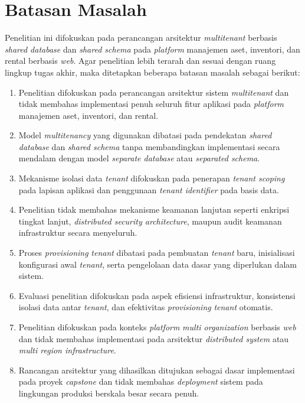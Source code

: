 \section{Batasan Masalah}

Penelitian ini difokuskan pada perancangan arsitektur \textit{multitenant} berbasis \textit{shared database}
dan \textit{shared schema} pada \textit{platform} manajemen aset, inventori, dan rental berbasis \textit{web}. Agar
penelitian lebih terarah dan sesuai dengan ruang lingkup tugas akhir, maka ditetapkan beberapa
batasan masalah sebagai berikut:

\begin{enumerate}
  \item Penelitian difokuskan pada perancangan arsitektur sistem \textit{multitenant} dan tidak membahas
    implementasi penuh seluruh fitur aplikasi pada \textit{platform} manajemen aset, inventori, dan rental.
  \item Model \textit{multitenancy} yang digunakan dibatasi pada pendekatan \textit{shared
    database} dan \textit{shared schema} tanpa membandingkan implementasi secara mendalam dengan
    model \textit{separate database} atau \textit{separated schema}.
  \item Mekanisme isolasi data \textit{tenant} difokuskan pada penerapan \textit{tenant scoping} pada
    lapisan aplikasi dan penggunaan \textit{tenant identifier} pada basis data.
  \item Penelitian tidak membahas mekanisme keamanan lanjutan seperti enkripsi tingkat lanjut,
    \textit{distributed security architecture}, maupun audit keamanan infrastruktur secara
    menyeluruh.
  \item Proses \textit{provisioning} \textit{tenant} dibatasi pada pembuatan \textit{tenant} baru, inisialisasi
    konfigurasi awal \textit{tenant}, serta pengelolaan data dasar yang diperlukan dalam sistem.
  \item Evaluasi penelitian difokuskan pada aspek efisiensi infrastruktur, konsistensi isolasi
    data antar \textit{tenant}, dan efektivitas \textit{provisioning} \textit{tenant} otomatis.
  \item Penelitian difokuskan pada konteks \textit{platform} \textit{multi organization} berbasis \textit{web} dan
    tidak membahas implementasi pada arsitektur \textit{distributed system} atau
    \textit{multi region infrastructure}.
  \item Rancangan arsitektur yang dihasilkan ditujukan sebagai dasar implementasi pada proyek
    \textit{capstone} dan tidak membahas \textit{deployment} sistem pada lingkungan produksi
    berskala besar secara penuh.
\end{enumerate}

